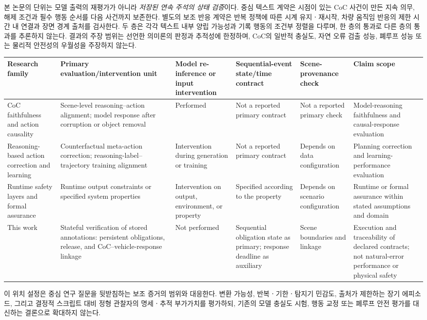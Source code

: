 본 논문의 단위는 모델 출력의 재평가가 아니라 \emph{저장된 연속 주석의 상태 검증}이다. 중심 텍스트 계약은 시점이 있는 CoC 사건이 만든 지속 의무, 해제 조건과 필수 행동 순서를 다음 사건까지 보존한다. 별도의 보조 반응 계약은 반복 정책에 따른 시계 유지ㆍ재시작, 차량 움직임 반응의 제한 시간 내 연결과 장면 경계 출처를 검사한다. 두 층은 각각 텍스트 내부 양립 가능성과 기록 행동의 조건부 정렬을 다루며, 한 층의 통과로 다른 층의 통과를 추론하지 않는다. 결과의 주장 범위는 선언한 의미론의 판정과 추적성에 한정하며, CoC의 일반적 충실도, 자연 오류 검출 성능, 폐루프 성능 또는 물리적 안전성의 우월성을 주장하지 않는다.

\begin{table}[t]
\centering
{}
\label{tab:related-position}
\scriptsize
\setlength{\tabcolsep}{3pt}
\begin{tabularx}{\textwidth}{L{0.135\textwidth}L{0.185\textwidth}L{0.145\textwidth}L{0.145\textwidth}L{0.12\textwidth}Y}
\toprule
Research family & Primary evaluation/intervention unit & Model re-inference or input intervention & Sequential-event state/time contract & Scene-provenance check & Claim scope \\
\midrule
CoC faithfulness and action causality \cite{mayumu2026faithfulness,nguyen2026vladrivebench,priyadershi2026lostinfog,panda2026cvaa} & Scene-level reasoning--action alignment; model response after corruption or object removal & Performed & Not a reported primary contract & Not a reported primary check & Model-reasoning faithfulness and causal-response evaluation \\
Reasoning-based action correction and learning \cite{peng2025counterfactualvla,tian2026ccot,jiang2026workdrive} & Counterfactual meta-action correction; reasoning-label--trajectory training alignment & Intervention during generation or training & Not a reported primary contract & Depends on data configuration & Planning correction and learning-performance evaluation \\
Runtime safety layers and formal assurance \cite{hu2025vlsa,behrmann2004uppaal,donze2010robustness,shalev2017rss} & Runtime output constraints or specified system properties & Intervention on output, environment, or property & Specified according to the property & Depends on scenario configuration & Runtime or formal assurance within stated assumptions and domain \\
This work & Stateful verification of stored annotations: persistent obligations, release, and CoC--vehicle-response linkage & Not performed & Sequential obligation state as primary; response deadline as auxiliary & Scene boundaries and linkage & Execution and traceability of declared contracts; not natural-error performance or physical safety \\
\bottomrule
\end{tabularx}
\end{table}

이 위치 설정은 중심 연구 질문을 뒷받침하는 보조 증거의 범위와 대응한다. 변환 가능성, 반복ㆍ기한ㆍ탐지기 민감도, 출처가 제한하는 장기 에피소드, 그리고 결정적 스크립트 대비 정형 관찰자의 명세ㆍ추적 부가가치를 평가하되, 기존의 모델 충실도 시험, 행동 교정 또는 폐루프 안전 평가를 대신하는 결론으로 확대하지 않는다.
